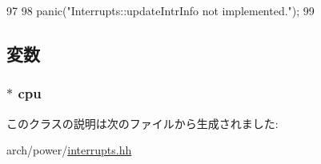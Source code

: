\begin{DoxyCode}
97     {
98         panic("Interrupts::updateIntrInfo not implemented.\n");
99     }
\end{DoxyCode}


\subsection{変数}
\hypertarget{classPowerISA_1_1Interrupts_a7a31ca9fefb2fe821f29a270678912db}{
\subsubsection[{cpu}]{$\ast$ {\bf cpu}}}
\label{classPowerISA_1_1Interrupts_a7a31ca9fefb2fe821f29a270678912db}


このクラスの説明は次のファイルから生成されました:\begin{DoxyCompactItemize}
\item 
arch/power/\hyperlink{power_2interrupts_8hh}{interrupts.hh}\end{DoxyCompactItemize}
